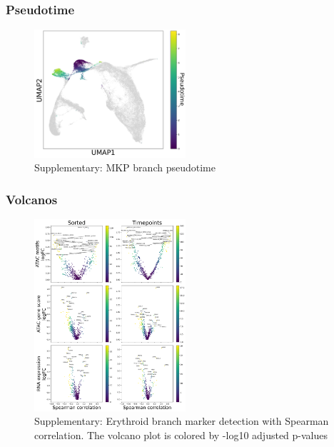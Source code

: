 \documentclass[a4paper]{article}
\begin{document}
\subsubsection{Pseudotime}
\begin{figure}[!htb]
  \centering
  \includegraphics[width=0.5\textwidth]{../figures/hematopoiesis/Basophil_40_109_single_branch_pseudotime.png}
  \caption{Supplementary: MKP branch pseudotime}
\end{figure}

\FloatBarrier
\subsubsection{Volcanos}

\begin{figure}[!htb]
  \centering
  \includegraphics[width=0.5\textwidth]{../figures/hematopoiesis/Basophil_40_109_smooth_none_single_branch_volcanos_motifs.png}
  \caption{Supplementary: Erythroid branch marker detection with Spearman correlation. The volcano plot is colored by -log10 adjusted p-values}
\end{figure}
\end{document}
